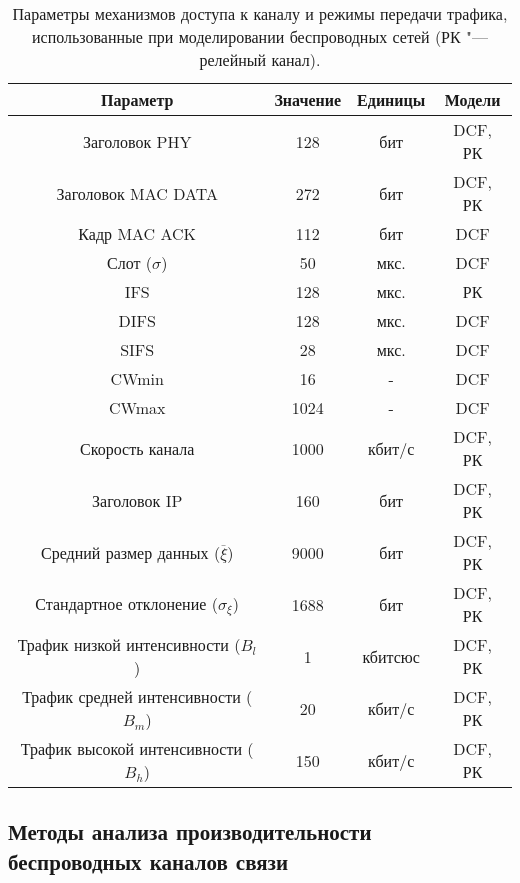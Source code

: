 \begin{table}[h!]\begin{center}
\begin{tabular}{|c|c|c|c|}\hline
Параметр & Значение & Единицы & Модели\\ \hline\hline
Заголовок PHY & 128 & бит & DCF, РК\\ \hline
Заголовок MAC DATA & 272 & бит & DCF, РК \\ \hline
Кадр MAC ACK & 112 & бит & DCF \\ \hline
Слот ($\sigma$) & 50 & мкс. & DCF \\ \hline
IFS & 128 & мкс. & РК \\ \hline
DIFS & 128 & мкс. & DCF\\ \hline
SIFS & 28 & мкс. & DCF \\ \hline
CWmin & 16 & - & DCF \\ \hline
CWmax & 1024 & - & DCF \\ \hline
Скорость канала & 1000 & кбит/с & DCF, РК \\ \hline
Заголовок IP & 160 & бит & DCF, РК \\ \hline\hline
Средний размер данных ($\overline{\xi}$) & 9000 & бит & DCF, РК\\ \hline
Стандартное отклонение ($\sigma_\xi$) & 1688 & бит & DCF, РК\\ \hline
Трафик низкой интенсивности ($B_l$) & 1 & кбитсюс & DCF, РК \\ \hline
Трафик средней интенсивности ($B_m$) & 20 & кбит/с & DCF, РК\\ \hline
Трафик высокой интенсивности ($B_h$) & 150 & кбит/с & DCF, РК \\ \hline
\end{tabular}\caption{Параметры механизмов доступа к каналу и режимы передачи трафика, использованные при моделировании беспроводных сетей (РК "--- релейный канал).}\label{tab:ch1_channel_parameters}
\end{center}\end{table}



\subsection{Методы анализа производительности беспроводных каналов связи}

